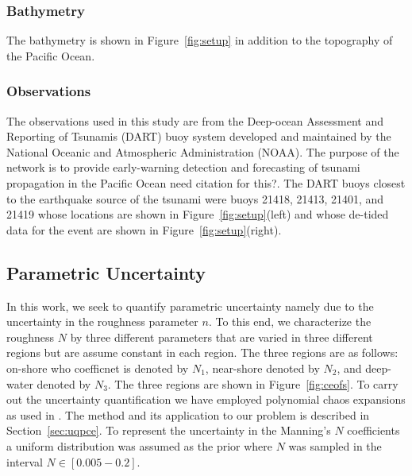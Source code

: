 \subsubsection{Bathymetry}
The bathymetry is shown in Figure~\ref{fig:setup} in addition to the topography
of the Pacific Ocean.
\subsubsection{Observations}

The observations used in this study are from the Deep-ocean Assessment and Reporting of Tsunamis (DART) buoy system developed and maintained by the National Oceanic and Atmospheric Administration (NOAA).  The purpose of the network is to provide early-warning detection and forecasting of tsunami propagation in the Pacific Ocean \alert{need citation for this?}.  The DART buoys closest to the earthquake source of the \tohoku tsunami were buoys 21418, 21413, 21401, and 21419 whose locations are shown in Figure~\ref{fig:setup}(left) and whose de-tided data for the event are shown in Figure~\ref{fig:setup}(right).
\subsection{Parametric Uncertainty}
In this work, we seek to quantify parametric uncertainty namely due 
to the uncertainty in the roughness parameter $n$. To this end,
we characterize the roughness $N$ by three different parameters
that are varied in three different regions but are assume
constant in each region. The three regions are as follows: 
on-shore who coefficnet is denoted by $N_1$, near-shore 
denoted by $N_2$, and deep-water denoted by $N_3$.
The three regions are shown in Figure~\ref{fig:ceofs}.
To carry out the uncertainty quantification we have employed polynomial chaos expansions 
as used in \cite{sraj:2013a,sraj:2013b}. The method and its application
to our problem is described in Section~\ref{sec:uqpce}.  
To represent the uncertainty in the Manning's $N$ coefficients a uniform distribution was assumed as the prior where $N$ was sampled in the interval $N \in [0.005-0.2]$.  
